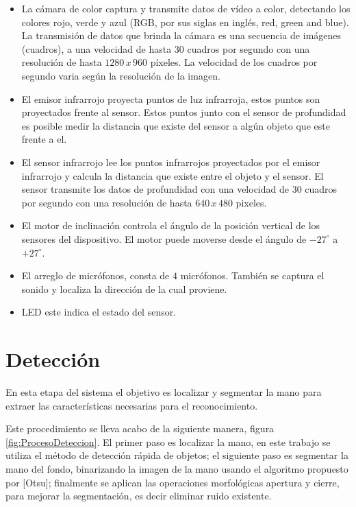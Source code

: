 \begin{itemize}
\item La cámara de color captura y transmite datos de vídeo a color, detectando los colores rojo, verde y azul (RGB, por sus siglas en ingl\'es, red, green and blue). La transmisión de datos que brinda la cámara es una secuencia de imágenes (cuadros), a una velocidad de hasta $30$ cuadros por segundo con una resolución de hasta $1280\, x \, 960$ p\'ixeles. La velocidad de los cuadros por segundo varia según la resolución de la imagen.

\item El emisor infrarrojo proyecta puntos de luz infrarroja, estos puntos son proyectados frente al sensor. Estos puntos junto con el sensor de profundidad es posible medir la distancia que existe del sensor a algún objeto que este frente a el.  

\item El sensor infrarrojo lee los puntos infrarrojos proyectados por el emisor infrarrojo y calcula la distancia que existe entre el objeto y el sensor. El sensor transmite los datos de profundidad con una velocidad de $30$ cuadros por segundo con una resolución de hasta $640 \, x \, 480$ pixeles.   

\item El motor de inclinación controla el \'angulo de la posición vertical de los sensores del dispositivo. El motor puede moverse desde el \'angulo de $-27^ \circ$ a $+27^\circ$.  

\item El arreglo de micrófonos, consta de $4$ micrófonos. También se captura el sonido y localiza la dirección de la cual proviene. 

\item LED este indica el estado del sensor.
\end{itemize}


\section{Detección}\label{sec:Detection}

En esta etapa del sistema el objetivo es localizar y segmentar la mano para extraer las características necesarias para el reconocimiento.

Este procedimiento se lleva acabo de la siguiente manera, figura  \ref{fig:ProcesoDeteccion}. El primer paso es localizar la mano, en este trabajo se utiliza el método de detección rápida de objetos; el siguiente paso es segmentar la mano del fondo, binarizando la imagen de la mano usando el algoritmo propuesto por [Otsu]; finalmente se aplican las operaciones morfológicas apertura y cierre, para mejorar la segmentación, es decir eliminar ruido existente. 

